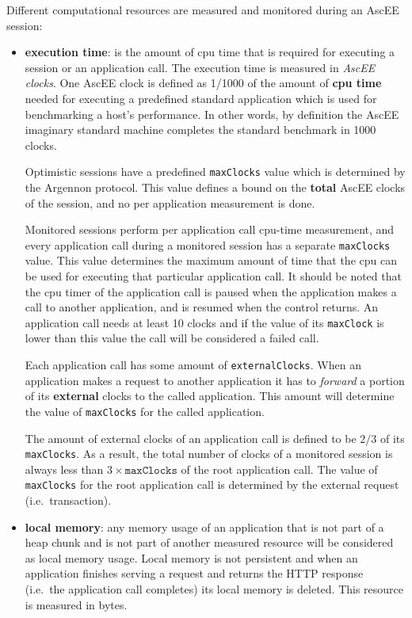 Different computational resources are measured and monitored during an AscEE session:
\begin{itemize}
    \item \textbf{execution time}:
    is the amount of cpu time that is required for executing a session or an application call. The execution time is
    measured in \emph{AscEE clocks}. One AscEE clock is defined as 1/1000 of the amount
    of \textbf{cpu time} needed for executing a predefined standard application which is used for benchmarking a host's
    performance. In other words, by definition the AscEE imaginary standard machine completes the standard benchmark
    in 1000 clocks.

    Optimistic sessions have a predefined \texttt{maxClocks} value which is determined by the Argennon protocol. This
    value defines a bound on the \textbf{total} AscEE clocks of the session, and no per application measurement is done.

    Monitored sessions perform per application call cpu-time measurement, and every application call during a monitored
    session has a separate \texttt{maxClocks} value. This value determines the maximum amount of time that the cpu
    can be used for executing that particular application call. It should be noted that the cpu timer of the
    application call is paused when the application makes a call to another application, and is resumed when the
    control returns. An application call
    needs at least 10 clocks and if the value of its \texttt{maxClock} is lower than this value the call will be
    considered a failed call.

    Each application call has some amount of \texttt{externalClocks}. When an application makes a request to another
    application it has to \emph{forward} a portion of its \textbf{external} clocks to the called application. This
    amount will determine the value of \texttt{maxClocks} for the called application.

    The amount of external clocks of an application
    call is defined to be \(2/3\) of its \texttt{maxClocks}. As a result, the total number of clocks of a monitored
    session is always less than \(3 \times \texttt{maxClocks}\) of the root application call. The value of
    \texttt{maxClocks} for
    the root application call is determined by the external request (i.e.\ transaction).

    \item \textbf{local memory}:
    any memory usage of an application that is not part of a heap chunk and is not part of another measured resource
    will be considered as local memory usage. Local memory is not persistent and when an application finishes serving a
    request and returns the HTTP response (i.e.\ the application call completes) its local memory is deleted.
    This resource is measured in bytes.


\end{itemize}
